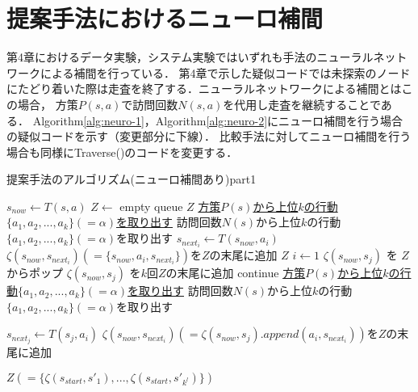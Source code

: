 \section{提案手法におけるニューロ補間}
第4章におけるデータ実験，システム実験ではいずれも手法のニューラルネットワークによる補間を行っている．
第4章で示した疑似コードでは未探索のノードにたどり着いた際は走査を終了する．ニューラルネットワークによる補間とはこの場合，
方策$P(s, a)$で訪問回数$N(s, a)$を代用し走査を継続することである．
Algorithm\ref{alg:neuro-1}，Algorithm\ref{alg:neuro-2}にニューロ補間を行う場合の疑似コードを示す（変更部分に下線）．
比較手法に対してニューロ補間を行う場合も同様にTraverse()のコードを変更する．
\begin{algorithm}
    \caption{提案手法のアルゴリズム(ニューロ補間あり)part1}
    \label{alg:neuro-1}
    \small
    \begin{algorithmic}[1]       
           \State $s_{now} \gets T(s, a)$
           \State $Z \gets $ empty queue
             \Return  $Z$
            \EndIf
             \State \underline{方策$P(s)$から上位$k$の行動$\{a_1, a_2, ..., a_{k}\}(=\alpha)$を取り出す}
            \Else
             \State 訪問回数$N(s)$から上位$k$の行動$\{a_1, a_2, ..., a_{k}\}(=\alpha)$を取り出す
            \EndIf
             \State $s_{{next}_i} \gets T(s_{now}, a_i)$
             \State $\zeta(s_{now},s_{{next}_i})(=\{s_{now}, a_i, s_{{next}_i}\})$を$Z$の末尾に追加
           \EndFor
             \Return $Z$
           \EndIf
           \State $i \gets 1$
                    \State $\zeta(s_{now}, s_{j})$ を $Z$からポップ
                        \State $\zeta(s_{now}, s_{j})$ を$k$回$Z$の末尾に追加
                        \State continue
                    \EndIf
                       \State \underline{方策$P(s)$から上位$k$の行動$\{a_1, a_2, ..., a_{k}\}(=\alpha)$を取り出す}
                   \Else
                    \State 訪問回数$N(s)$から上位$k$の行動$\{a_1, a_2, ..., a_{k}\}(=\alpha)$を取り出す
                   \EndIf
                    
                        \State $s_{{next}_j} \gets T(s_{j}, a_i)$
                        \State $\zeta(s_{now},s_{{next}_i})(=\zeta(s_{now}, s_{j}).append({a_i, s_{{next}_i}}))$を$Z$の末尾に追加
                    \EndFor
                    
                \EndFor     
           \EndWhile
           \Return $Z(=\{\zeta(s_{start}, {s'}_1), ..., \zeta(s_{start}, {s'}_{k^l})\})$
        \EndFunction
    \end{algorithmic}
\end{algorithm}
